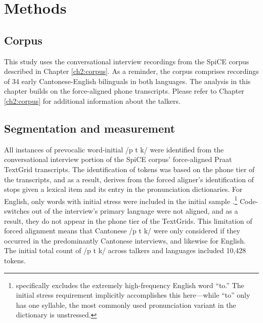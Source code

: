 \section{Methods}\label{ch4:sec:methods}

\subsection{Corpus}

This study uses the conversational interview recordings from the SpiCE corpus described in Chapter \ref{ch2:corpus}. As a reminder, the corpus comprises recordings of 34 early Cantonese-English bilinguals in both languages. The analysis in this chapter builds on the force-aligned phone transcripts. Please refer to Chapter \ref{ch2:corpus} for additional information about the talkers. 

\subsection{Segmentation and measurement}

All instances of prevocalic word-initial /p t k/ were identified from the conversational interview portion of the SpiCE corpus' force-aligned Praat TextGrid transcripts. The identification of tokens was based on the phone tier of the transcripts, and as a result, derives from the forced aligner's identification of stops given a lexical item and its entry in the pronunciation dictionaries. For English, only words with initial stress were included in the initial sample \citep{lisker_1967_some}.\footnote{\citet{chodroff_2017_structure} specifically excludes the extremely high-frequency English word ``to.'' The initial stress requirement implicitly accomplishes this here---while ``to'' only has one syllable, the most commonly used pronunciation variant in the dictionary is unstressed.} Code-switches out of the interview's primary language were not aligned, and as a result, they do not appear in the phone tier of the TextGrids. This limitation of forced alignment means that Cantonese /p t k/ were only considered if they occurred in the predominantly Cantonese interviews, and likewise for English. The initial total count of /p t k/ across talkers and languages included 10,428 tokens. 

